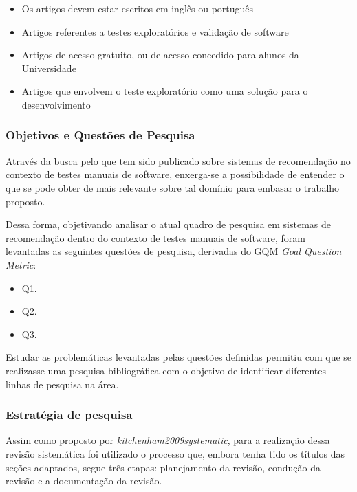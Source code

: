 \begin{itemize}
    \item Os artigos devem estar escritos em inglês ou português
    \item Artigos referentes a testes exploratórios e validação de software
    \item Artigos de acesso gratuito, ou de acesso concedido para alunos da Universidade
    \item Artigos que envolvem o teste exploratório como uma solução para o desenvolvimento
\end{itemize}

\subsubsection{Objetivos e Questões de Pesquisa}

\par Através da busca pelo que tem sido publicado sobre sistemas de recomendação no contexto de testes manuais de software, enxerga-se a possibilidade de entender o que se pode obter de mais relevante sobre tal domínio para embasar o trabalho proposto.

\par Dessa forma, objetivando analisar o atual quadro de pesquisa em sistemas de recomendação dentro do contexto de testes  manuais de software, foram levantadas as seguintes questões de pesquisa, derivadas do GQM \textit{Goal Question Metric}: 

\begin{itemize}
    \item Q1. 
    \item Q2. 
    \item Q3. 
\end{itemize}

\par Estudar as problemáticas levantadas pelas questões definidas permitiu com que se realizasse uma pesquisa bibliográfica com o objetivo de identificar diferentes linhas de pesquisa na área. 

\subsubsection{Estratégia de pesquisa}

Assim como proposto por \textit{kitchenham2009systematic}, para a realização dessa revisão sistemática foi utilizado o processo que, embora tenha tido os títulos das seções adaptados, segue três etapas: planejamento da revisão, condução da revisão e a documentação da revisão. 

